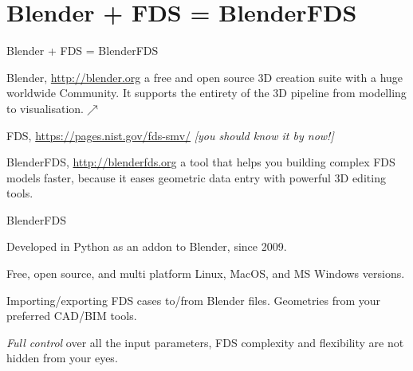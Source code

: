 \documentclass[aspectratio=169]{beamer}
\begin{document}
\section{Blender + FDS = BlenderFDS}
\begin{frame}[fragile]{Blender + FDS = BlenderFDS}
    \begin{vfilleditems}
        \item<1-> Blender, \url{http://blender.org}
            {\small \linebreak a free and open source 3D creation suite with a huge worldwide Community.
            \linebreak It supports the entirety of the 3D pipeline from modelling to visualisation.$\nearrow$}
        \item<2-> FDS, \url{https://pages.nist.gov/fds-smv/}
            {\small \linebreak \emph{[you should know it by now!]}}
        \item<3-> BlenderFDS, \url{http://blenderfds.org}
            {\small \linebreak a tool that helps you building complex FDS models faster,
            \linebreak because it eases geometric data entry with powerful 3D editing tools.}
    \end{vfilleditems}  
\end{frame}

\begin{frame}[fragile]{BlenderFDS}
    \begin{vfilleditems}
        \item<1-> Developed in Python as an addon to Blender, since 2009.
        \item<2-> Free, open source, and multi platform
            {\small \linebreak Linux, MacOS, and MS Windows versions.}
        \item<3-> Importing/exporting
            {\small \linebreak FDS cases to/from Blender files.
            \linebreak Geometries from your preferred CAD/BIM tools.}
        \item<4-> \emph{Full control} over all the input parameters,
            {\small \linebreak FDS complexity and flexibility are not hidden from your eyes. }
    \end{vfilleditems}  
\end{frame}
\end{document}
